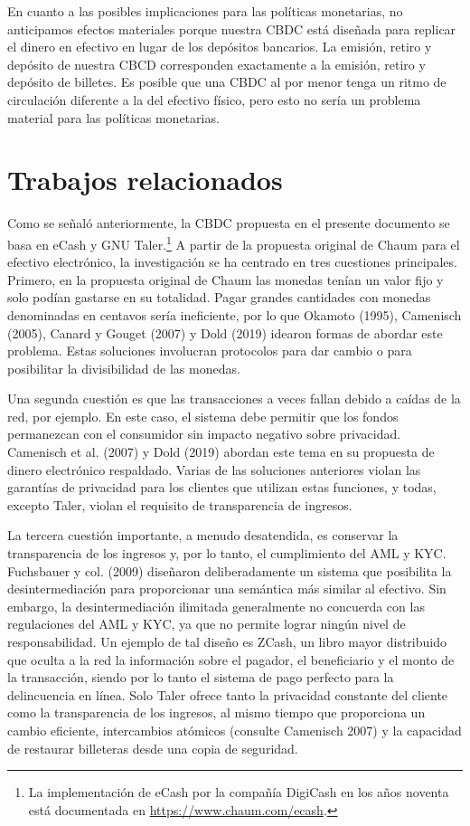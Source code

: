 \documentclass[10pt,spanish]{article}
\begin{document}
En cuanto a las posibles implicaciones para las políticas monetarias, no
anticipamos efectos materiales porque nuestra CBDC está diseñada para
replicar el dinero en efectivo en lugar de los depósitos bancarios. La
emisión, retiro y depósito de nuestra CBCD corresponden exactamente a la
emisión, retiro y depósito de billetes. Es posible que una CBDC al por
menor tenga un ritmo de circulación diferente a la del efectivo físico,
pero esto no sería un problema material para las políticas monetarias.

\hypertarget{trabajos-relacionados}{%
\section{Trabajos relacionados}\label{6.-trabajos-relacionados}}

Como se señaló anteriormente, la CBDC propuesta en el presente documento
se basa en eCash y GNU Taler.\footnote{La implementación de eCash por la
compañía DigiCash en los años noventa está documentada en
\url{https://www.chaum.com/ecash}.} A
partir de la propuesta original de Chaum para el efectivo electrónico,
la investigación se ha centrado en tres cuestiones principales. Primero,
en la propuesta original de Chaum las monedas tenían un valor fijo y
solo podían gastarse en su totalidad. Pagar grandes cantidades con
monedas denominadas en centavos sería ineficiente, por lo que Okamoto
(1995), Camenisch (2005), Canard y Gouget (2007) y Dold (2019) idearon
formas de abordar este problema. Estas soluciones involucran protocolos
para dar cambio o para posibilitar la divisibilidad de las monedas.

Una segunda cuestión es que las transacciones a veces fallan debido a
caídas de la red, por ejemplo. En este caso, el sistema debe permitir
que los fondos permanezcan con el consumidor sin impacto negativo sobre
privacidad. Camenisch et al. (2007) y Dold (2019) abordan este tema en
su propuesta de dinero electrónico respaldado. Varias de las soluciones
anteriores violan las garantías de privacidad para los clientes que
utilizan estas funciones, y todas, excepto Taler, violan el requisito de
transparencia de ingresos.

La tercera cuestión importante, a menudo desatendida, es conservar la
transparencia de los ingresos y, por lo tanto, el cumplimiento del AML y
KYC. Fuchsbauer y col. (2009) diseñaron deliberadamente un sistema que
posibilita la desintermediación para proporcionar una semántica más
similar al efectivo. Sin embargo, la desintermediación ilimitada
generalmente no concuerda con las regulaciones del AML y KYC, ya que no
permite lograr ningún nivel de responsabilidad. Un ejemplo de tal diseño
es ZCash, un libro mayor distribuido que oculta a la red la información
sobre el pagador, el beneficiario y el monto de la transacción, siendo
por lo tanto el sistema de pago perfecto para la delincuencia en línea.
Solo Taler ofrece tanto la privacidad constante del cliente como la
transparencia de los ingresos, al mismo tiempo que proporciona un cambio
eficiente, intercambios atómicos (consulte Camenisch 2007) y la
capacidad de restaurar billeteras desde una copia de seguridad.
\end{document}
